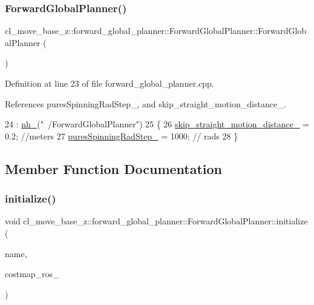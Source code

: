 \subsubsection{\texorpdfstring{Forward\+Global\+Planner()}{ForwardGlobalPlanner()}}
{\footnotesize\ttfamily cl\+\_\+move\+\_\+base\+\_\+z\+::forward\+\_\+global\+\_\+planner\+::\+Forward\+Global\+Planner\+::\+Forward\+Global\+Planner (\begin{DoxyParamCaption}{ }\end{DoxyParamCaption})}



Definition at line 23 of file forward\+\_\+global\+\_\+planner.\+cpp.



References pures\+Spinning\+Rad\+Step\+\_\+, and skip\+\_\+straight\+\_\+motion\+\_\+distance\+\_\+.


\begin{DoxyCode}
24     : \hyperlink{classcl__move__base__z_1_1forward__global__planner_1_1ForwardGlobalPlanner_aab61c90829040df58fb99dff3b566c72}{nh\_}(\textcolor{stringliteral}{"~/ForwardGlobalPlanner"})
25 \{
26     \hyperlink{classcl__move__base__z_1_1forward__global__planner_1_1ForwardGlobalPlanner_abafd101fa62caf2d74f118a0b4bb948c}{skip\_straight\_motion\_distance\_} = 0.2; \textcolor{comment}{//meters}
27     \hyperlink{classcl__move__base__z_1_1forward__global__planner_1_1ForwardGlobalPlanner_a6aed6f8f6e57a8c5821977814d0b9402}{puresSpinningRadStep\_} = 1000;         \textcolor{comment}{// rads}
28 \}
\end{DoxyCode}


\subsection{Member Function Documentation}
\mbox{\label{classcl__move__base__z_1_1forward__global__planner_1_1ForwardGlobalPlanner_a3db25ea418729d257876394b5c0987dc}} 
\subsubsection{\texorpdfstring{initialize()}{initialize()}}
{\footnotesize\ttfamily void cl\+\_\+move\+\_\+base\+\_\+z\+::forward\+\_\+global\+\_\+planner\+::\+Forward\+Global\+Planner\+::initialize (\begin{DoxyParamCaption}\item[{std\+::string}]{name,  }\item[{costmap\+\_\+2d\+::\+Costmap2\+D\+R\+OS $\ast$}]{costmap\+\_\+ros\+\_\+ }\end{DoxyParamCaption})}




